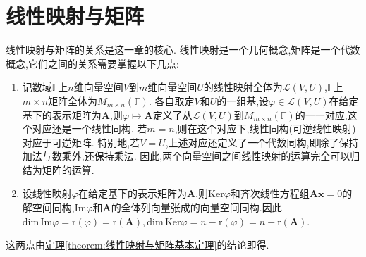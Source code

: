 \documentclass[lang=cn,newtx,10pt,scheme=chinese]{elegantbook}
\begin{document}
\section{线性映射与矩阵}

线性映射与矩阵的关系是这一章的核心. 线性映射是一个几何概念,矩阵是一个代数概念,它们之间的关系需要掌握以下几点:
\begin{enumerate}[(1)]
    \item\label{线性映射与矩阵基本结论1} 记数域\(\mathbb{F}\)上\(n\)维向量空间\(V\)到\(m\)维向量空间\(U\)的线性映射全体为\(\mathcal{L}(V,U)\),\(\mathbb{F}\)上\(m\times n\)矩阵全体为\(M_{m\times n}(\mathbb{F})\). 各自取定\(V\)和\(U\)的一组基,设\(\varphi\in\mathcal{L}(V,U)\)在给定基下的表示矩阵为\(\boldsymbol{A}\),则\(\varphi\mapsto\boldsymbol{A}\)定义了从\(\mathcal{L}(V,U)\)到\(M_{m\times n}(\mathbb{F})\)的一一对应,这个对应还是一个线性同构. 若\(m = n\),则在这个对应下,线性同构(可逆线性映射)对应于可逆矩阵. 特别地,若\(V = U\),上述对应还定义了一个代数同构,即除了保持加法与数乘外,还保持乘法. 因此,两个向量空间之间线性映射的运算完全可以归结为矩阵的运算.

    \item\label{线性映射与矩阵基本结论2} 设线性映射\(\varphi\)在给定基下的表示矩阵为\(\boldsymbol{A}\),则\(\text{Ker}\varphi\)和齐次线性方程组\(\boldsymbol{A}\boldsymbol{x}=0\)的解空间同构,\(\text{Im}\varphi\)和\(\boldsymbol{A}\)的全体列向量张成的向量空间同构.因此$\mathrm{dim}\,\mathrm{Im}\varphi =\mathrm{r}\left( \varphi \right) =\mathrm{r}\left( \boldsymbol{A} \right) ,\mathrm{dim}\,\mathrm{Ker}\varphi =n-\mathrm{r}\left( \varphi \right) =n-\mathrm{r}\left( \boldsymbol{A} \right)$.
\end{enumerate}
这两点由\hyperref[theorem:线性映射与矩阵基本定理]{定理\ref{theorem:线性映射与矩阵基本定理}}的结论即得.
\end{document}
